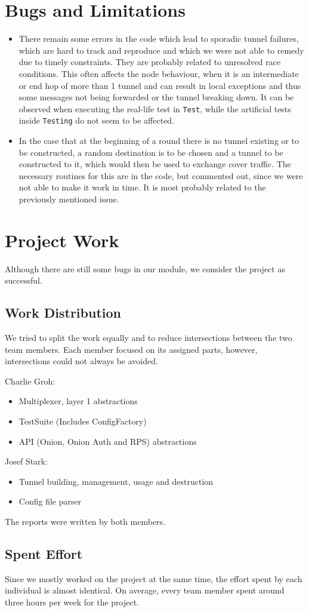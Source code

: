 \documentclass{article}
\begin{document}
\section{Bugs and Limitations}
\begin{itemize}
	\item There remain some errors in the code which lead to sporadic tunnel failures, which are hard to track and reproduce and which we were not able to remedy due to timely constraints. They are probably related to unresolved race conditions. This often affects the node behaviour, when it is an intermediate or end hop of more than 1 tunnel and can result in local exceptions and thus some messages not being forwarded or the tunnel breaking down. It can be observed when executing the real-life test in \texttt{Test}, while the artificial tests inside \texttt{Testing} do not seem to be affected.
	\item In the case that at the beginning of a round there is no tunnel existing or to be constructed, a random destination is to be chosen and a tunnel to be constructed to it, which would then be used to exchange cover traffic. The necessary routines for this are in the code, but commented out, since we were not able to make it work in time. It is most probably related to the previously mentioned issue.
\end{itemize}


\section{Project Work}
Although there are still some bugs in our module, we consider the project as successful.

\subsection{Work Distribution}
We tried to split the work equally and to reduce intersections between the two team members. Each member focused on its assigned parts, however, intersections could not always be avoided.

Charlie Groh:
\begin{itemize}
	\item Multiplexer, layer 1 abstractions
	\item TestSuite (Includes ConfigFactory)
	\item API (Onion, Onion Auth and RPS) abstractions
\end{itemize}

Josef Stark:
\begin{itemize}
	\item Tunnel building, management, usage and destruction
	\item Config file parser
\end{itemize}
The reports were written by both members.


\subsection{Spent Effort}
Since we mostly worked on the project at the same time, the effort spent by each individual is
almost identical. On average, every team member spent around three hours per week for the project.
\end{document}

